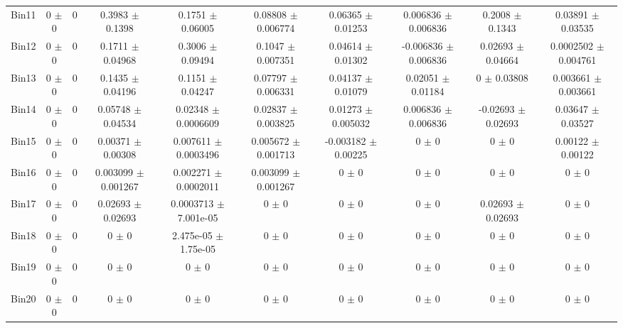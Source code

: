 \begin{tabular}{@{\extracolsep{4pt}}lccccccccc@{}}
     Bin11 & 0 $\pm$ 0 & 0 & 0.3983 $\pm$ 0.1398 & 0.1751 $\pm$ 0.06005 & 0.08808 $\pm$ 0.006774 & 0.06365 $\pm$ 0.01253 & 0.006836 $\pm$ 0.006836 & 0.2008 $\pm$ 0.1343 & 0.03891 $\pm$ 0.03535 \\ 
     Bin12 & 0 $\pm$ 0 & 0 & 0.1711 $\pm$ 0.04968 & 0.3006 $\pm$ 0.09494 & 0.1047 $\pm$ 0.007351 & 0.04614 $\pm$ 0.01302 & -0.006836 $\pm$ 0.006836 & 0.02693 $\pm$ 0.04664 & 0.0002502 $\pm$ 0.004761 \\ 
     Bin13 & 0 $\pm$ 0 & 0 & 0.1435 $\pm$ 0.04196 & 0.1151 $\pm$ 0.04247 & 0.07797 $\pm$ 0.006331 & 0.04137 $\pm$ 0.01079 & 0.02051 $\pm$ 0.01184 & 0 $\pm$ 0.03808 & 0.003661 $\pm$ 0.003661 \\ 
     Bin14 & 0 $\pm$ 0 & 0 & 0.05748 $\pm$ 0.04534 & 0.02348 $\pm$ 0.0006609 & 0.02837 $\pm$ 0.003825 & 0.01273 $\pm$ 0.005032 & 0.006836 $\pm$ 0.006836 & -0.02693 $\pm$ 0.02693 & 0.03647 $\pm$ 0.03527 \\ 
     Bin15 & 0 $\pm$ 0 & 0 & 0.00371 $\pm$ 0.00308 & 0.007611 $\pm$ 0.0003496 & 0.005672 $\pm$ 0.001713 & -0.003182 $\pm$ 0.00225 & 0 $\pm$ 0 & 0 $\pm$ 0 & 0.00122 $\pm$ 0.00122 \\ 
     Bin16 & 0 $\pm$ 0 & 0 & 0.003099 $\pm$ 0.001267 & 0.002271 $\pm$ 0.0002011 & 0.003099 $\pm$ 0.001267 & 0 $\pm$ 0 & 0 $\pm$ 0 & 0 $\pm$ 0 & 0 $\pm$ 0 \\ 
     Bin17 & 0 $\pm$ 0 & 0 & 0.02693 $\pm$ 0.02693 & 0.0003713 $\pm$ 7.001e-05 & 0 $\pm$ 0 & 0 $\pm$ 0 & 0 $\pm$ 0 & 0.02693 $\pm$ 0.02693 & 0 $\pm$ 0 \\ 
     Bin18 & 0 $\pm$ 0 & 0 & 0 $\pm$ 0 & 2.475e-05 $\pm$ 1.75e-05 & 0 $\pm$ 0 & 0 $\pm$ 0 & 0 $\pm$ 0 & 0 $\pm$ 0 & 0 $\pm$ 0 \\ 
     Bin19 & 0 $\pm$ 0 & 0 & 0 $\pm$ 0 & 0 $\pm$ 0 & 0 $\pm$ 0 & 0 $\pm$ 0 & 0 $\pm$ 0 & 0 $\pm$ 0 & 0 $\pm$ 0 \\ 
     Bin20 & 0 $\pm$ 0 & 0 & 0 $\pm$ 0 & 0 $\pm$ 0 & 0 $\pm$ 0 & 0 $\pm$ 0 & 0 $\pm$ 0 & 0 $\pm$ 0 & 0 $\pm$ 0 \\ 
\hline\hline
  \end{tabular}
